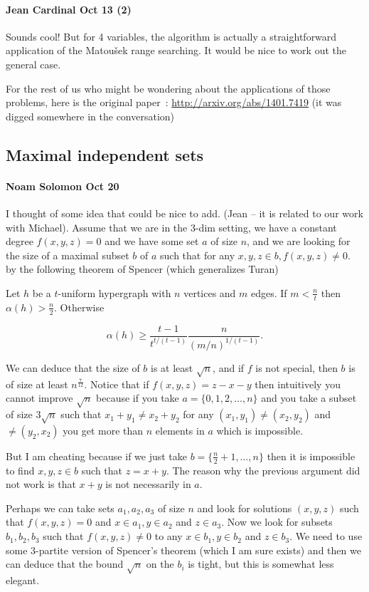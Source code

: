 \paragraph{Jean Cardinal Oct 13 (2)}
Sounds cool!
But for 4 variables, the algorithm is actually a straightforward
application of the Matou\v{s}ek range searching.
It would be nice to work out the general case.

For the rest of us who might be wondering about the applications of those
problems, here is the original paper~\cite{RSS14}:
\url{http://arxiv.org/abs/1401.7419}
(it was digged somewhere in the conversation)


\subsection{Maximal independent sets}
\paragraph{Noam Solomon Oct 20}
I thought of some idea that could be nice to add. (Jean -- it is related to
our work with Michael).
Assume that we are in the 3-dim setting, we have a constant degree
$f(x,y,z)=0$ and we have some set $a$ of size $n$, and we are looking for the
size of a maximal subset $b$ of $a$ such that for any $x,y,z \in b, f(x,y,z) \ne
0$.
by the following theorem of Spencer (which generalizes Turan)
\begin{theorem}\label{thm:spencer}
Let $h$ be a $t$-uniform hypergraph with $n$ vertices and $m$ edges. If
$m<\frac{n}{t}$ then $\alpha(h) > \frac{n}{2}$. Otherwise

$$
\alpha (h) \ge \frac{t-1}{t^{t/(t-1)}} \frac n{(m/n)^{1/(t-1)}}.
$$
\end{theorem}
We can deduce that the size of $b$ is at least $\sqrt n$, and if $f$ is not
special, then $b$ is of size at least $n^{\frac{7}{12}}$. Notice that if
$f(x,y,z)=z-x-y$ then intuitively you cannot improve $\sqrt n$ because if you
take $a=\{0,1,2,\ldots,n\}$ and you take a subset of size $3\sqrt n$ such that
$x_1+y_1 \ne x_2+y_2$ for any $(x_1,y_1) \ne (x_2,y_2)$ and $\ne (y_2,x_2)$
you get more than $n$ elements in $a$ which is impossible.

But I am cheating because if we just take
$b=\{\frac{n}{2}+1,\ldots,n\}$ then it is
impossible to find $x,y,z \in b$ such that $z=x+y$. The reason why the previous
argument did not work is that $x+y$ is not necessarily in $a$.

Perhaps we can take sets $a_1, a_2, a_3$ of size $n$ and look for solutions
$(x,y,z)$ such that $f(x,y,z)=0$ and
$x\in a_1, y\in a_2$ and $z\in a_3$. Now we look for subsets $b_1,b_2, b_3$ such
that
$f(x,y,z) \ne 0$ to any $x\in b_1, y\in b_2$ and $z\in b_3$. We need to use some
3-partite version of Spencer's theorem (which I am sure exists) and then we
can deduce that the bound $\sqrt n$ on the $b_i$ is tight, but this is somewhat
less elegant.

